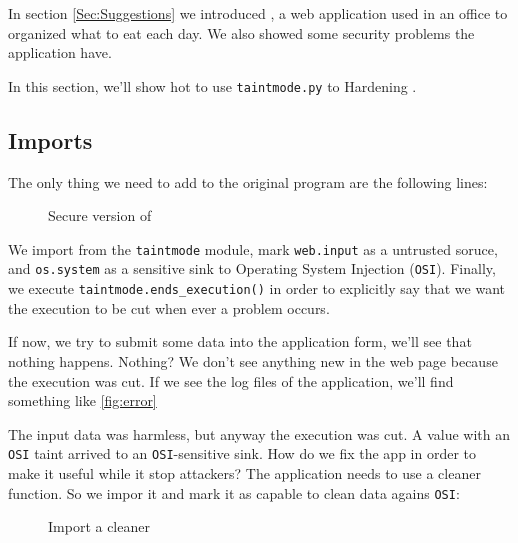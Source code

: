 In section \ref{Sec:Suggestions} we introduced \suggestions, a web application used in an
office to organized what to eat each day. We also showed some security problems the application have.

In this section, we'll show hot to use \texttt{taintmode.py} to Hardening \suggestions.

\subsection*{Imports}

The only thing we need to add to the original program are the following lines:

\begin{figure}[t]
{\small{
\begin{minipage}[t]{0.5\linewidth}
 
\end{minipage}
\caption{\label{fig:secured} Secure version of \suggestions}
}}
\end{figure}

We import from the \texttt{taintmode} module, mark \texttt{web.input} as a
untrusted soruce, and \texttt{os.system} as a sensitive sink to Operating System Injection (\texttt{OSI}).
Finally, we execute \texttt{taintmode.ends\_execution()} in order to explicitly say that we want the
execution to be cut when ever a problem occurs.

If now, we try to submit some data into the application form, we'll see that nothing happens. Nothing?
We don't see anything new in the web page because the execution was cut. If we see the log files of the 
application, we'll find something like \ref{fig:error}

\begin{figure}[t]
{\small{
\begin{minipage}[t]{0.5\linewidth}
 
\end{minipage}
\caption{\label{fig:securederror} \suggestions}
}}
\end{figure}

The input data was harmless, but anyway the execution was cut. A value with an \texttt{OSI}
taint arrived to an \texttt{OSI}-sensitive sink. How do we fix the app in order to make it
useful while it stop attackers? The application needs to use a cleaner function. So we impor it
and mark it as capable to clean data agains \texttt{OSI}:

\begin{figure}[t]
{\small{
\begin{minipage}[t]{0.5\linewidth}
 
\end{minipage}
\caption{\label{fig:securedcleaner} Import a cleaner}
}}
\end{figure}

